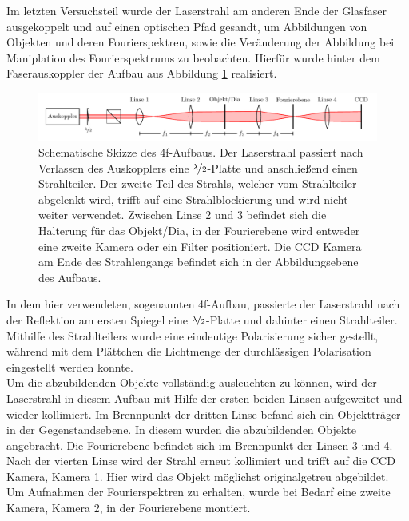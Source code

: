 

Im letzten Versuchsteil wurde der Laserstrahl am anderen Ende der Glasfaser ausgekoppelt und auf einen optischen Pfad gesandt, um Abbildungen von Objekten und deren Fourierspektren, sowie die Veränderung der Abbildung bei Maniplation des Fourierspektrums zu beobachten. Hierfür wurde hinter dem Faserauskoppler der Aufbau aus Abbildung \ref{fig:4f-aufbau} realisiert. \\

\begin{figure}[h]
	\centering
	\includegraphics[width=1\linewidth]{graphs/versuchsaufbau/4f-aufbau.pdf}
	\caption[Schematische Skizze des 4f-Aufbaus]{
		Schematische Skizze des 4f-Aufbaus. Der Laserstrahl passiert nach Verlassen des Auskopplers eine $\nicefrac{\lambda}{2}$-Platte und anschließend einen Strahlteiler. Der zweite Teil des Strahls, welcher vom Strahlteiler abgelenkt wird, trifft auf eine Strahlblockierung und wird nicht weiter verwendet. Zwischen Linse 2 und 3 befindet sich die Halterung für das Objekt/Dia, in der Fourierebene wird entweder eine zweite Kamera oder ein Filter positioniert. Die CCD Kamera am Ende des Strahlengangs befindet sich in der Abbildungsebene des Aufbaus.
	}
	\label{fig:4f-aufbau}
\end{figure}

In dem hier verwendeten, sogenannten 4f-Aufbau, passierte der Laserstrahl nach der Reflektion am ersten Spiegel eine $\nicefrac{\lambda}{2}$-Platte und dahinter einen Strahlteiler. Mithilfe des Strahlteilers wurde eine eindeutige Polarisierung sicher gestellt, während mit dem Plättchen die Lichtmenge der durchlässigen Polarisation eingestellt werden konnte.\\

Um die abzubildenden Objekte vollständig ausleuchten zu können, wird der Laserstrahl in diesem Aufbau mit Hilfe der ersten beiden Linsen aufgeweitet und wieder kollimiert. Im Brennpunkt der dritten Linse befand sich ein Objektträger in der Gegenstandsebene. In diesem wurden die abzubildenden Objekte angebracht. Die Fourierebene befindet sich im Brennpunkt der Linsen 3 und 4. Nach der vierten Linse wird der Strahl erneut kollimiert und trifft auf die CCD Kamera, Kamera 1. Hier wird das Objekt möglichst originalgetreu abgebildet. Um Aufnahmen der Fourierspektren zu erhalten, wurde bei Bedarf eine zweite Kamera, Kamera 2, in der Fourierebene montiert. \\ 


